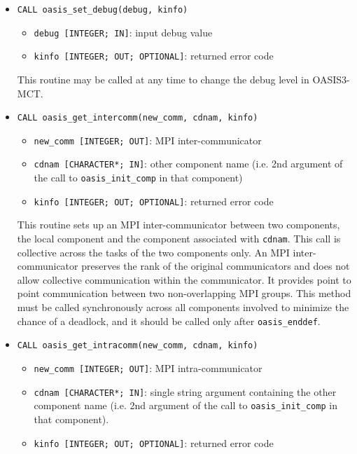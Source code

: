 \begin{itemize}
  \vspace{0.2cm}
\item {\tt CALL oasis\_set\_debug(debug, kinfo)}
  \begin{itemize}
  \item {\tt debug [INTEGER; IN]}: input debug value
  \item {\tt kinfo [INTEGER; OUT; OPTIONAL]}: returned error code
  \end{itemize}

  This routine may be called at any time to change the debug level in
  OASIS3-MCT.  
  
  \vspace{0.2cm}
  
\item {\tt CALL oasis\_get\_intercomm(new\_comm, cdnam, kinfo)}
  \begin{itemize}
  \item {\tt new\_comm [INTEGER; OUT]}: MPI inter-communicator
  \item {\tt cdnam [CHARACTER*; IN]}: other component name (i.e. 2nd argument of  the call to {\tt oasis\_init\_comp} in that component)
  \item {\tt kinfo [INTEGER; OUT; OPTIONAL]}: returned error code
  \end{itemize}

  This routine sets up an MPI inter-communicator between two components,
  the local component and the component
  associated with {\tt cdnam}.  This call is collective across the
  tasks of the two components only.
  An MPI inter-communicator preserves the rank of the original communicators
  and does not allow collective communication within the communicator.  It
  provides point to point communication between two non-overlapping MPI groups.
  This method must be called synchronously across all components involved to
  minimize the chance of a deadlock, and it should be called only after
  {\tt oasis\_enddef}.
  
  \vspace{0.2cm}
\item {\tt CALL oasis\_get\_intracomm(new\_comm, cdnam, kinfo)}
  \begin{itemize}
  \item {\tt new\_comm [INTEGER; OUT]}: MPI intra-communicator
  \item {\tt cdnam [CHARACTER*; IN]}: single string argument containing the other component name (i.e. 2nd argument of the call to {\tt oasis\_init\_comp} in that component). 
  \item {\tt kinfo [INTEGER; OUT; OPTIONAL]}: returned error code
  \end{itemize}


\end{itemize}
